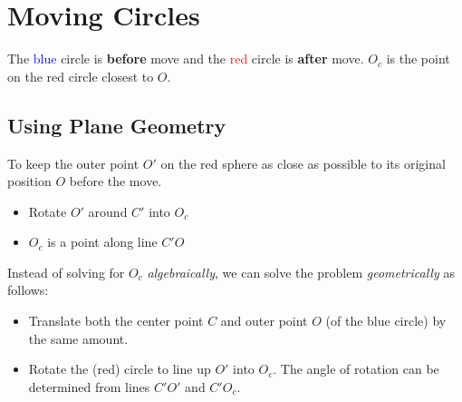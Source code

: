 \documentclass{article}
\begin{document}

\section*{Moving Circles}

The \textcolor{blue}{blue} circle is \textbf{before} move and the
\textcolor{red}{red} circle is \textbf{after} move.
$O_c$ is the point on the red circle closest to $O$.

\subsection*{Using Plane Geometry}

To keep the outer point $O'$ on the red sphere as close as possible to its original position $O$ before the move.
\begin{itemize}
    \item Rotate $O'$ around $C'$ into $O_c$
    \item $O_c$ is a point along line $C'O$
\end{itemize}

Instead of solving for $O_c$ \textit{algebraically}, we can solve the problem \textit{geometrically} as follows:

\begin{itemize}
    \item Translate both the center point $C$ and outer point $O$ (of the blue circle) by the same amount.
    \item Rotate the (red) circle to line up $O'$ into $O_c$. The angle of rotation can be determined from lines $C'O'$ and $C'O_c$.
\end{itemize}
\end{document}
